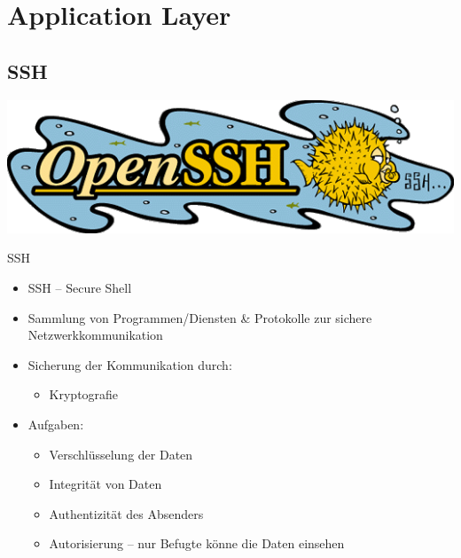 \documentclass[xcolor=dvipsnames]{beamer}
\begin{document}
\section{Application Layer}
\subsection{SSH}
\begin{frame}
\centering
\includegraphics[scale=0.5]{ssh}
\end{frame}

\begin{frame}{SSH}
\begin{itemize}
	\item SSH -- Secure Shell
	\item Sammlung von Programmen/Diensten \& Protokolle zur sichere Netzwerkkommunikation
	\item Sicherung der Kommunikation durch:
	\begin{itemize}
		\item Kryptografie
	\end{itemize}
	\item Aufgaben:
	\begin{itemize}
		\item Verschlüsselung der Daten
		\item Integrität von Daten 
		\item Authentizität des Absenders
		\item Autorisierung -- nur Befugte könne die Daten einsehen
	\end{itemize}
\end{itemize}
\end{frame}
\end{document}

